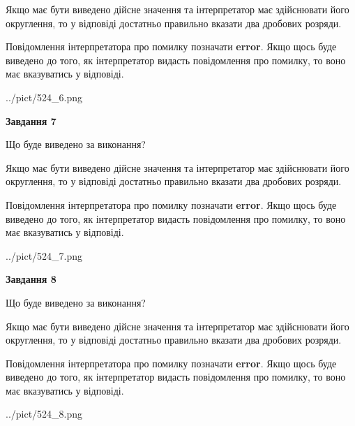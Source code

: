 \documentclass[12pt, ukrainian]{article}
\begin{document}
{\begin {Large}
Якщо має бути виведено дійсне значення та інтерпретатор має здійснювати його округлення, 
то у відповіді достатньо правильно вказати два дробових розряди.

Повідомлення інтерпретатора про помилку позначати \textbf{error}.
Якщо щось буде виведено до того, як інтерпретатор видасть повідомлення про помилку, 
то воно має вказуватись у відповіді. \par

\begin{center}
	{../pict/524_6.png}
\end{center}
\newpage

{\begin {center}\textbf{Завдання 7}\end {center}}\par
Що буде виведено за виконання? \par

Якщо має бути виведено дійсне значення та інтерпретатор має здійснювати його округлення, 
то у відповіді достатньо правильно вказати два дробових розряди.

Повідомлення інтерпретатора про помилку позначати \textbf{error}.
Якщо щось буде виведено до того, як інтерпретатор видасть повідомлення про помилку, 
то воно має вказуватись у відповіді. \par

\begin{center}
	{../pict/524_7.png}
\end{center}
\newpage

{\begin {center}\textbf{Завдання 8}\end {center}}\par
Що буде виведено за виконання? \par

Якщо має бути виведено дійсне значення та інтерпретатор має здійснювати його округлення, 
то у відповіді достатньо правильно вказати два дробових розряди.

Повідомлення інтерпретатора про помилку позначати \textbf{error}.
Якщо щось буде виведено до того, як інтерпретатор видасть повідомлення про помилку, 
то воно має вказуватись у відповіді. \par

\begin{center}
	{../pict/524_8.png}
\end{center}
\newpage


\end{Large}}
\end{document}
